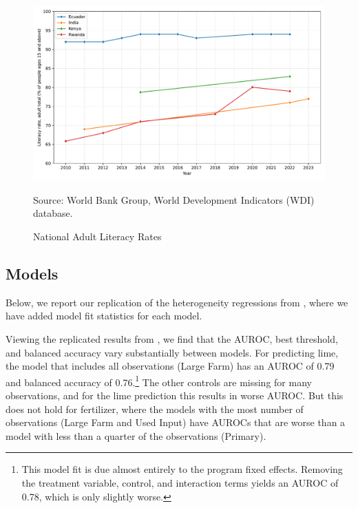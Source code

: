 \documentclass[12pt]{article}
\begin{document}
\begin{figure}[H]
    \centering
    \caption{National Adult Literacy Rates}
    \includegraphics[width=\textwidth]{../output/literacy_rate.pdf}
    \begin{minipage}{0.9\textwidth}
    \footnotesize
    Source: World Bank Group, World Development Indicators (WDI) database. 
    \end{minipage}
    \label{fig:literacy_rate}
\end{figure}

\subsection{Models}
Below, we report our replication of the heterogeneity regressions from \textcite{fabregas_digital_2025}, where we have added model fit statistics for each model.




Viewing the replicated results from \textcite{fabregas_digital_2025}, we find that the AUROC, best threshold, and balanced accuracy vary substantially between models. For predicting lime, the model that includes all observations (Large Farm) has an AUROC of 0.79 and balanced accuracy of 0.76.\footnote{This model fit is due almost entirely to the program fixed effects. Removing the treatment variable, control, and interaction terms yields an AUROC of 0.78, which is only slightly worse.} The other controls are missing for many observations, and for the lime prediction this results in worse AUROC. But this does not hold for fertilizer, where the models with the most number of observations (Large Farm and Used Input) have AUROCs that are worse than a model with less than a quarter of the observations (Primary).
\end{document}
